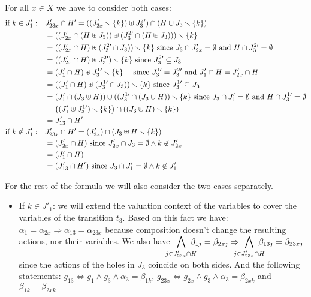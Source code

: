 \documentclass[runningheads]{llncs}
\begin{document}
\begin{enumerate}
For all $x \in X$ we have to consider both  cases:
\begin{align*}
	\text{if } k \in J'_1:\quad &  J'_{23x} \cap H'  
=((J'_{2x}  \smallsetminus {\left\{k\right\}})\uplus J^{2 \prime}_{3} ) \cap (H\uplus J_3 \smallsetminus\{k\} )\\
&=((J'_{2x}\cap (H\uplus J_3))\uplus (J^{2 \prime}_{3}\cap (H\uplus J_3)))\smallsetminus {\left\{k\right\}}\\
&=((J'_{2x}\cap H)\uplus (J^{2 \prime}_{3}\cap  J_3))\smallsetminus {\left\{k\right\}}\text{ since } J_3\cap J'_{2x} = \emptyset \text{ and } H\cap J^{2 \prime}_{3} = \emptyset\\
& =((J'_{2x}\cap H)\uplus J^{2 \prime}_{3})\smallsetminus {\left\{k\right\}}\text{ since } J^{2 \prime}_{3}\subseteq J_3\\
& =(J'_1\cap H)\uplus J^{1 \prime}_{3}\smallsetminus {\left\{k\right\}}\quad \text{ since } J^{1 \prime}_{3}=J^{2 \prime}_{3} \text{ and } J'_1 \cap H = J'_{2x} \cap H\\
&= ((J'_1 \cap H) \uplus (J^{1 \prime}_{3} \cap J_3)) \smallsetminus {\left\{k\right\}}\text{ since } J^{1 \prime}_{3}\subseteq J_3\\ 
& = (J'_1\cap (J_3 \uplus H)) \uplus ((J^{1 \prime}_{3} \cap (J_3 \uplus H)) \smallsetminus {\left\{k\right\}} \text{ since } J_3\cap J'_{1} = \emptyset \text{ and } H\cap J^{1 \prime}_{3} = \emptyset\\
		& = {\left((J'_1  \uplus J^{1 \prime}_{3})\smallsetminus {\left\{k\right\}}\right)} \cap {\left((J_{3} \uplus H) \smallsetminus{\left\{k\right\}}\right)}\\
		& = J'_{13} \cap H'\\
\text{if } k \notin J'_1:\quad &	J'_{23x} \cap H'  = {\left(J'_{2x} \right)} \cap {\left(J_3 \uplus H \smallsetminus{\left\{k\right\}}\right)} \\
& = {\left(J'_{2x}\cap H \right)} \text{ since } J'_{2x}\cap J_3=\emptyset \land k\not\in J'_{2x} \\
& = {\left(J'_1\cap H \right)}\\
& = {\left(J'_{13}\cap H' \right)} \text{ since } J_3\cap J'_1=\emptyset \land k\not\in J_1'\\
\end{align*}

For the rest of the formula we will also consider the two cases separately. 


\begin{itemize}
\item If $k \in J'_1$: we will extend the valuation context of the variables to cover the variables of the transition $t_3$. Based on this fact we have: $ \alpha_{1} = \alpha_{2x} \Rightarrow \alpha_{13} = \alpha_{23x}$ because composition doesn't change the resulting actions, nor their variables. 
We also have 
${\displaystyle \bigwedge_\subbox{j \in J'_{23x} \cap H} \beta_{1j} = \beta_{2xj} \Rightarrow  \bigwedge_\subbox{j \in J'_{23x} \cap H} \beta_{13j} = \beta_{23xj}}$ since the actions of the holes in $J_3$ coincide on both sides. And the following statements: 
$g_{13} \Leftrightarrow g_1 \wedge g_3 \wedge \alpha_3=\beta_{1k}$, 
$g_{23x}  \Leftrightarrow g_{2x} \wedge g_3 \wedge \alpha_3=\beta_{2xk}$ and $\beta_{1k} = \beta_{2xk}$\\



\end{itemize}
\end{enumerate}
\end{document}
